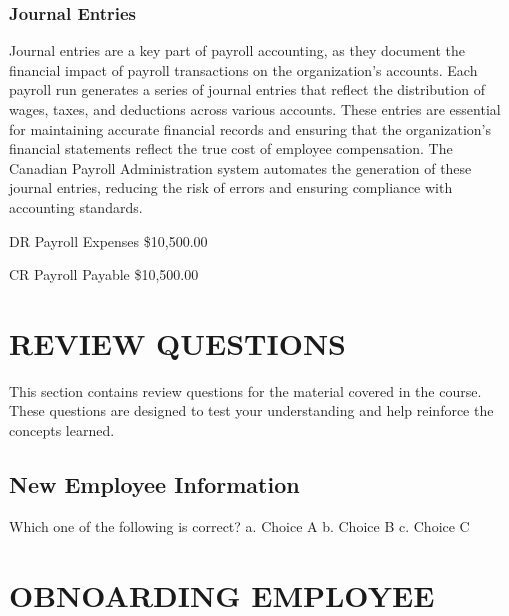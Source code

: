 \documentclass[letterpaper,10pt,english]{sphinxmanual}
\begin{document}
\subsection{Journal Entries}
\label{\detokenize{payroll_accounting:id1}}
\sphinxAtStartPar
Journal entries are a key part of payroll accounting, as they document the financial impact of payroll transactions on the organization’s accounts. Each payroll run generates a series of journal entries that reflect the distribution of wages, taxes, and deductions across various accounts.
These entries are essential for maintaining accurate financial records and ensuring that the organization’s financial statements reflect the true cost of employee compensation. The Canadian Payroll Administration system automates the generation of these journal entries, reducing the risk of errors and ensuring compliance with accounting standards.

\begin{DUlineblock}{0em}
\item[] DR    Payroll Expenses    \$10,500.00
\item[]
\begin{DUlineblock}{\DUlineblockindent}
\item[] CR  Payroll Payable   \$10,500.00
\end{DUlineblock}
\end{DUlineblock}

\sphinxstepscope


\chapter{REVIEW QUESTIONS}
\label{\detokenize{review_questions:review-questions}}\label{\detokenize{review_questions::doc}}
\sphinxAtStartPar
This section contains review questions for the material covered in the course. These questions are designed to test your understanding and help reinforce the concepts learned.


\section{New Employee Information}
\label{\detokenize{review_questions:new-employee-information}}
\sphinxAtStartPar
Which one of the following is correct?
a. Choice A
b. Choice B
c. Choice C

\sphinxstepscope


\chapter{OBNOARDING EMPLOYEE}
\label{\detokenize{onboarding_employee:obnoarding-employee}}\label{\detokenize{onboarding_employee::doc}}
\end{document}
